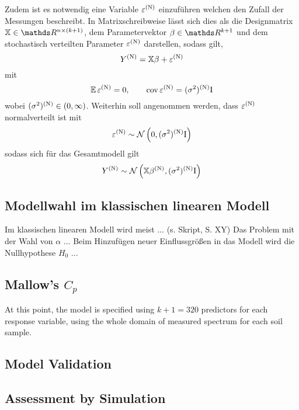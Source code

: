 		Zudem ist es notwendig eine Variable $\varepsilon^{\mathrm{(N)}}$ einzuführen welchen den Zufall der Messungen beschreibt.
	    In Matrixschreibweise lässt sich dies als die Designmatrix $\mathbb{X} \in \SR^{n \times (k+1)}$, dem Parametervektor $\beta \in \SR^{k+1}$ und dem stochastisch  verteilten Parameter $\varepsilon^{\mathrm{(N)}}$ darstellen, sodass gilt,
		\[
			Y^{\mathrm{(N)}} = \mathbb{X}\beta + \varepsilon^{\mathrm{(N)}}
		\]
		mit 
		\[
			\operatorname{\mathbb{E}} \varepsilon^{\mathrm{(N)}} = 0, \qquad \operatorname{cov} \varepsilon^{\mathrm{(N)}} = (\sigma^2)^{\mathrm{(N)}} \mathrm{I}
		\]
		wobei $(\sigma^2)^{\mathrm{(N)}} \in (0,\infty)$.
		Weiterhin soll angenommen werden, dass $\varepsilon^{\mathrm{(N)}}$ normalverteilt ist mit
	    \[
			\varepsilon^{\mathrm{(N)}} \sim \mathcal{N} \left( 0,(\sigma^2)^{\mathrm{(N)}}\mathrm{I} \right)
		\]
	    sodass sich für das Gesamtmodell gilt 
		\[
			Y^{\mathrm{(N)}} \sim \mathcal{N} \left( \mathbb{X}\beta^{\mathrm{(N)}},(\sigma^2)^{\mathrm{(N)}} \mathrm{I} \right)
		\]
	

	\subsection{Modellwahl im klassischen linearen Modell}
	\label{ssec:mlr}
	Im klassischen linearen Modell wird meist ... (s. Skript, S. XY)
	Das Problem mit der Wahl von $\alpha$ ...
	Beim Hinzufügen neuer Einflussgrößen in das Modell wird die Nullhypothese $H_0$ ...
	
		


	\subsection{Mallow's $C_{p}$}
	\label{ssec:mallows-C_p}
	
		At this point, the model is specified using $k+1 = 320$ predictors for each response variable, using the whole domain of measured spectrum for each soil sample.
		
		
	
	

		
	\subsection{Model Validation}
	\label{ssec:model-validation}
	
	
	
	\subsection{Assessment by Simulation}
	\label{ssec:simulation}
	
		
		
